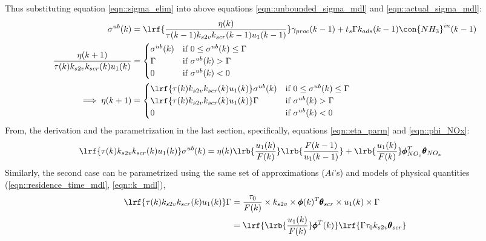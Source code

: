 Thus substituting equation \ref{eqn::sigma_elim} into above equations \ref{eqn::unbounded_sigma_mdl} and \ref{eqn::actual_sigma_mdl}:
\begin{align}
        \sigma^{ub}(k) &= \lrf{\frac{\eta(k)}{\tau(k-1) k_{s2v} k_{scr}(k-1) u_1(k-1)}} \gamma_{proc}(k-1) + t_s \Gamma k_{ads}(k-1) \con{NH_3}^{in}(k-1)\\
        \frac{\eta(k+1)}{\tau(k) k_{s2v} k_{scr}(k) u_1(k)} &=
        \begin{cases}
                                \sigma^{ub}(k)     & \text{if }  0 \leq \sigma^{ub}(k) \leq \Gamma\\
                                \Gamma             & \text{if }  \sigma^{ub}(k) > \Gamma \\
                                0                  & \text{if }  \sigma^{ub}(k) < 0
        \end{cases} \\
        \implies \eta(k+1) &=
        \begin{cases}
        \lrf{\tau(k) k_{s2v} k_{scr}(k) u_1(k)}\sigma^{ub}(k)         & \text{if }
                0 \leq \sigma^{ub}(k) \leq \Gamma\\
        \lrf{\tau(k) k_{s2v} k_{scr}(k) u_1(k)} \Gamma                & \text{if }
                \sigma^{ub}(k) > \Gamma \\
        0                                                             & \text{if }
                \sigma^{ub}(k) < 0
        \end{cases}
        \label{eqn::eta_cases}
\end{align}
From, the derivation and the parametrization in the last section, specifically, equations \ref{eqn::eta_parm} and
\ref{eqn::phi_NOx}:
\begin{align}
        \lrf{\tau(k) k_{s2v} k_{scr}(k) u_1(k)}\sigma^{ub}(k) &=
        \eta(k) \lrb{\frac{u_1(k)}{F(k)}} \lrb{\frac{F(k-1)}{u_1(k-1)}}
        +\lrb{\frac{u_1(k)}{F(k)}} \pmb \phi_{NO_x}^T \pmb \theta_{NO_x}
        \label{eqn::sigma_ub_param}
\end{align}
Similarly, the second case can be parametrized using the same set of approximations ($Ai$'s) and models of physical quantities (\ref{eqn::residence_time_mdl}, \ref{eqn::k_mdl}),
\begin{align*}
        \lrf{\tau(k) k_{s2v} k_{scr}(k) u_1(k)} \Gamma  &= \frac{\tau_0}{F(k)} \times k_{s2v} \times \pmb \phi(k)^T \pmb \theta_{scr} \times u_1(k) \times \Gamma\\
        &= \lrf{\lrb{\frac{u_1(k)}{F(k)}} \pmb \phi^T(k) } \lrf{\Gamma \tau_0 k_{s2v} \pmb \theta_{scr}}
\end{align*}
